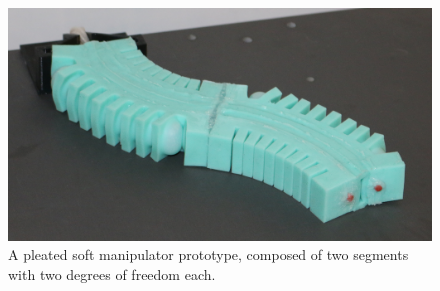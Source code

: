 \begin{figure}[htb]
\centering
\includegraphics[width=\columnwidth]{Figures/manipulators/pleated_manipulator_real}
\caption[A pleated soft manipulator prototype.]{A pleated soft manipulator prototype, composed of two segments with two degrees of freedom each.}
\label{fig:pleated_manipulator}
\end{figure} 